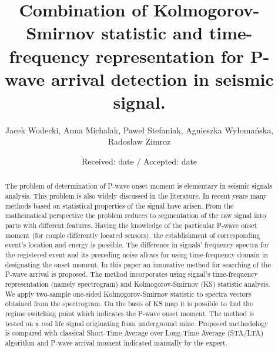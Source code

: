 \documentclass[smallextended]{svjour3}       %
\begin{document}
\title{Combination of Kolmogorov-Smirnov statistic and time-frequency representation for P-wave arrival detection in seismic signal.}



 \author{%
 Jacek Wodecki, Anna Michalak, Pawe{\l} Stefaniak, Agnieszka Wy{\l}oma{\'n}ska, Rados{\l}aw Zimroz
}%




\date{Received: date / Accepted: date}

\maketitle

\begin{abstract}
The problem of determination of P-wave onset moment is elementary in seismic signals analysis. This problem is also widely discussed in the literature. In recent years many methods based on statistical properties of the signal have arisen. From the mathematical perspective the problem reduces to segmentation of the raw signal into parts with different features. Having the knowledge of the particular P-wave onset moment (for couple differently located sensors), the establishment of corresponding event's location and energy is possible. The difference in signals' frequency spectra for the registered event and its preceding noise allows for using time-frequency domain in designating the onset moment. In this paper an innovative method for searching of the P-wave arrival is proposed. The method incorporates using signal's time-frequency representation (namely spectrogram) and Kolmogorov-Smirnov (KS) statistic analysis. We apply two-sample one-sided Kolmogorov-Smirnov statistic to spectra vectors obtained from the spectrogram. On the basis of KS map it is possible to find the regime switching point which indicates the P-wave onset moment. The method is tested on a real life signal originating from underground mine. Proposed methodology is compared with classical Short-Time Average over Long-Time Average (STA/LTA) algorithm and P-wave arrival moment indicated manually by the expert.

\end{abstract}
\end{document}
